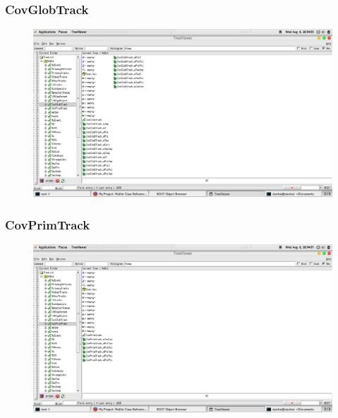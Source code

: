 \documentclass[10pt]{beamer}
\begin{document}
\label{CovGlobTrack}
\begin{frame}
  \frametitle{CovGlobTrack}
  \begin{figure}[hbtp]
    \centering
    \includegraphics[width=\textwidth]{CovGlobTrack.png}
  \end{figure}
\end{frame}
\label{CovPrimTrack}
\begin{frame}
  \frametitle{CovPrimTrack}
  \begin{figure}[hbtp]
    \centering
    \includegraphics[width=\textwidth]{CovPrimTrack.png}
  \end{figure}
\end{frame}
\label{CpvCluster}
\end{document}
